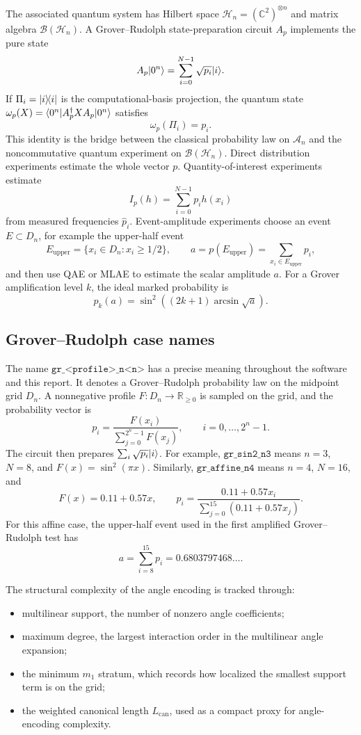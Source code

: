 The associated quantum system has Hilbert space
\(\mathcal{H}_n=(\mathbb{C}^2)^{\otimes n}\) and matrix algebra
\(\mathcal{B}(\mathcal{H}_n)\). A Grover--Rudolph state-preparation circuit
\(A_p\) implements the pure state
\[
  A_p\lvert 0^n\rangle
  =
  \sum_{i=0}^{N-1}\sqrt{p_i}\lvert i\rangle.
\]
If \(\Pi_i=\lvert i\rangle\!\langle i\rvert\) is the computational-basis projection, the quantum
state \(\omega_p(X)=\langle 0^n\rvert A_p^\dagger X A_p\lvert 0^n\rangle\) satisfies
\[
  \omega_p(\Pi_i)=p_i.
\]
This identity is the bridge between the classical probability law on
\(\mathcal{A}_n\) and the noncommutative quantum experiment on
\(\mathcal{B}(\mathcal{H}_n)\). Direct distribution experiments estimate the
whole vector \(p\). Quantity-of-interest experiments estimate
\[
  I_p(h)=\sum_{i=0}^{N-1}p_i h(x_i)
\]
from measured frequencies \(\hat{p}_i\). Event-amplitude experiments choose an
event \(E\subset D_n\), for example the upper-half event
\[
  E_{\mathrm{upper}}=\{x_i\in D_n: x_i\ge 1/2\},
  \qquad
  a=p(E_{\mathrm{upper}})=\sum_{x_i\in E_{\mathrm{upper}}}p_i,
\]
and then use QAE or MLAE to estimate the scalar amplitude \(a\). For a Grover
amplification level \(k\), the ideal marked probability is
\[
  p_k(a)=
  \sin^2\!\left((2k+1)\arcsin\sqrt{a}\right).
\]

\subsection{Grover--Rudolph case names}
\label{subsec:gr-case-names}

The name \(\texttt{gr\_<profile>\_n<n>}\) has a precise meaning throughout the
software and this report. It denotes a Grover--Rudolph probability law on the
midpoint grid \(D_n\). A nonnegative profile \(F:D_n\to\mathbb{R}_{\ge 0}\) is
sampled on the grid, and the probability vector is
\[
  p_i=\frac{F(x_i)}{\sum_{j=0}^{2^n-1}F(x_j)},
  \qquad i=0,\ldots,2^n-1.
\]
The circuit then prepares \(\sum_i\sqrt{p_i}\lvert i\rangle\). For example,
\(\texttt{gr\_sin2\_n3}\) means \(n=3\), \(N=8\), and
\(F(x)=\sin^2(\pi x)\). Similarly, \(\texttt{gr\_affine\_n4}\) means \(n=4\),
\(N=16\), and
\[
  F(x)=0.11+0.57x,
  \qquad
  p_i=
  \frac{0.11+0.57x_i}{\sum_{j=0}^{15}(0.11+0.57x_j)}.
\]
For this affine case, the upper-half event used in the first amplified
Grover--Rudolph test has
\[
  a
  =
  \sum_{i=8}^{15}p_i
  =
  0.6803797468\ldots.
\]

The structural complexity of the angle encoding is tracked through:
\begin{itemize}[leftmargin=*]
  \item multilinear support, the number of nonzero angle coefficients;
  \item maximum degree, the largest interaction order in the multilinear angle
        expansion;
  \item the minimum \(m_1\) stratum, which records how localized the smallest
        support term is on the grid;
  \item the weighted canonical length \(L_{\mathrm{can}}\), used as a compact
        proxy for angle-encoding complexity.
\end{itemize}

